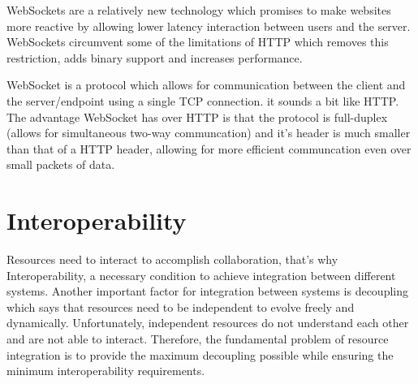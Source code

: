 \documentclass[runningheads,a4paper]{llncs}
\begin{document}
WebSockets\cite{matching} are a relatively new technology which promises to make websites more reactive by allowing lower latency interaction between users and the server. WebSockets circumvent some of the limitations of HTTP which removes this restriction, adds binary support and increases performance.

WebSocket is a protocol which allows for communication between the client and the server/endpoint using a single TCP connection. it sounds a bit like HTTP. The advantage WebSocket has over HTTP is that the protocol is full-duplex (allows for simultaneous two-way communcation) and it’s header is much smaller than that of a HTTP header, allowing for more efficient communcation even over small packets of data.

\section{Interoperability}
Resources need to interact to accomplish collaboration, that’s why Interoperability, a necessary condition to achieve integration between different systems. Another important factor for integration between systems is decoupling which says that resources need to be independent to evolve freely and dynamically. Unfortunately, independent resources do not understand each other and are not able to interact. Therefore, the fundamental problem of resource integration is to provide the maximum decoupling possible while ensuring the minimum interoperability requirements.
\end{document}
